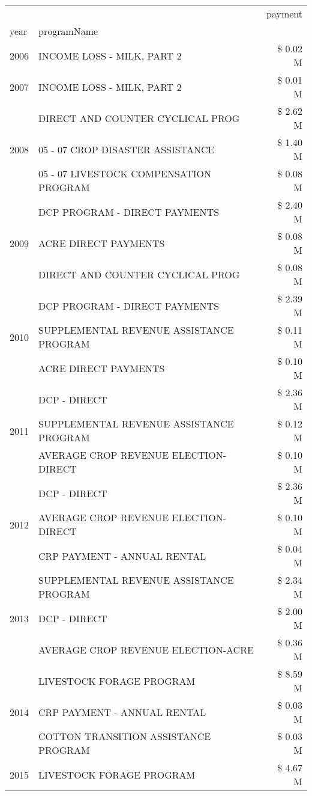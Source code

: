 \begin{tabular}{llr}
\toprule
 &  & payment \\
year & programName &  \\
\midrule
2006 & INCOME LOSS - MILK, PART 2 & \$ 0.02 M \\
\cline{1-3}
2007 & INCOME LOSS - MILK, PART 2 & \$ 0.01 M \\
\cline{1-3}
\multirow[t]{3}{*}{2008} & DIRECT AND COUNTER CYCLICAL PROG & \$ 2.62 M \\
 & 05 - 07 CROP DISASTER ASSISTANCE & \$ 1.40 M \\
 & 05 - 07 LIVESTOCK COMPENSATION PROGRAM & \$ 0.08 M \\
\cline{1-3}
\multirow[t]{3}{*}{2009} & DCP PROGRAM - DIRECT PAYMENTS & \$ 2.40 M \\
 & ACRE DIRECT PAYMENTS & \$ 0.08 M \\
 & DIRECT AND COUNTER CYCLICAL PROG & \$ 0.08 M \\
\cline{1-3}
\multirow[t]{3}{*}{2010} & DCP PROGRAM - DIRECT PAYMENTS & \$ 2.39 M \\
 & SUPPLEMENTAL REVENUE ASSISTANCE PROGRAM & \$ 0.11 M \\
 & ACRE DIRECT PAYMENTS & \$ 0.10 M \\
\cline{1-3}
\multirow[t]{3}{*}{2011} & DCP - DIRECT & \$ 2.36 M \\
 & SUPPLEMENTAL REVENUE ASSISTANCE PROGRAM & \$ 0.12 M \\
 & AVERAGE CROP REVENUE ELECTION-DIRECT & \$ 0.10 M \\
\cline{1-3}
\multirow[t]{3}{*}{2012} & DCP - DIRECT & \$ 2.36 M \\
 & AVERAGE CROP REVENUE ELECTION-DIRECT & \$ 0.10 M \\
 & CRP PAYMENT - ANNUAL RENTAL & \$ 0.04 M \\
\cline{1-3}
\multirow[t]{3}{*}{2013} & SUPPLEMENTAL REVENUE ASSISTANCE PROGRAM & \$ 2.34 M \\
 & DCP - DIRECT & \$ 2.00 M \\
 & AVERAGE CROP REVENUE ELECTION-ACRE & \$ 0.36 M \\
\cline{1-3}
\multirow[t]{3}{*}{2014} & LIVESTOCK FORAGE PROGRAM & \$ 8.59 M \\
 & CRP PAYMENT - ANNUAL RENTAL & \$ 0.03 M \\
 & COTTON TRANSITION ASSISTANCE PROGRAM & \$ 0.03 M \\
\cline{1-3}
\multirow[t]{3}{*}{2015} & LIVESTOCK FORAGE PROGRAM & \$ 4.67 M \\

\end{tabular}
